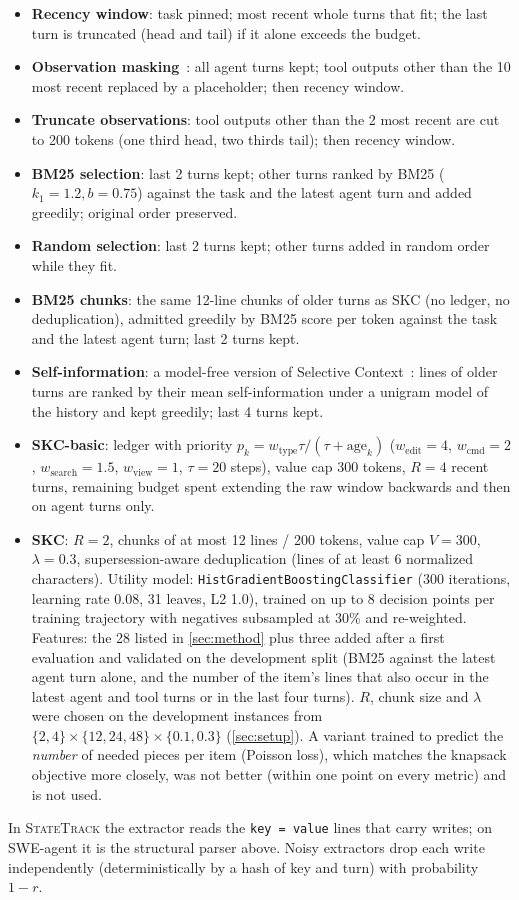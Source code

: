 \begin{itemize}[leftmargin=*,itemsep=1pt,topsep=2pt]
\item \textbf{Recency window}: task pinned; most recent whole turns that fit;
the last turn is truncated (head and tail) if it alone exceeds the budget.
\item \textbf{Observation masking}~\citep{lindenbauer2025complexity}: all agent
turns kept; tool outputs other than the 10 most recent replaced by a
placeholder; then recency window.
\item \textbf{Truncate observations}: tool outputs other than the 2 most recent
are cut to 200 tokens (one third head, two thirds tail); then recency window.
\item \textbf{BM25 selection}: last 2 turns kept; other turns ranked by BM25
($k_1=1.2,b=0.75$) against the task and the latest agent turn and added
greedily; original order preserved.
\item \textbf{Random selection}: last 2 turns kept; other turns added in random
order while they fit.
\item \textbf{BM25 chunks}: the same 12-line chunks of older turns as SKC (no
ledger, no deduplication), admitted greedily by BM25 score per token against the
task and the latest agent turn; last 2 turns kept.
\item \textbf{Self-information}: a model-free version of Selective
Context~\citep{li2023selective}: lines of older turns are ranked by their mean
self-information under a unigram model of the history and kept greedily; last
4 turns kept.
\item \textbf{SKC-basic}: ledger with priority $p_k=w_{\mathrm{type}}\tau/(\tau+\mathrm{age}_k)$
($w_{\text{edit}}=4$, $w_{\text{cmd}}=2$, $w_{\text{search}}=1.5$,
$w_{\text{view}}=1$, $\tau=20$ steps), value cap 300 tokens, $R=4$ recent turns,
remaining budget spent extending the raw window backwards and then on agent
turns only.
\item \textbf{SKC}: $R=2$, chunks of at most 12 lines / 200 tokens, value cap
$V=300$, $\lambda=0.3$, supersession-aware deduplication (lines of at least 6
normalized characters). Utility model: \texttt{HistGradientBoostingClassifier}
(300 iterations, learning rate 0.08, 31 leaves, L2 1.0), trained on up to 8
decision points per training trajectory with negatives subsampled at 30\% and
re-weighted. Features: the 28 listed in \cref{sec:method} plus three added after
a first evaluation and validated on the development split (BM25 against the
latest agent turn alone, and the number of the item's lines that also occur in
the latest agent and tool turns or in the last four turns). $R$, chunk size and
$\lambda$ were chosen on the development instances from
$\{2,4\}\times\{12,24,48\}\times\{0.1,0.3\}$ (\cref{sec:setup}). A variant
trained to predict the \emph{number} of needed pieces per item (Poisson loss),
which matches the knapsack objective more closely, was not better (within one
point on every metric) and is not used.
\end{itemize}
In \textsc{StateTrack} the extractor reads the \texttt{key = value} lines that
carry writes; on SWE-agent it is the structural parser above. Noisy extractors
drop each write independently (deterministically by a hash of key and turn)
with probability $1-r$.
